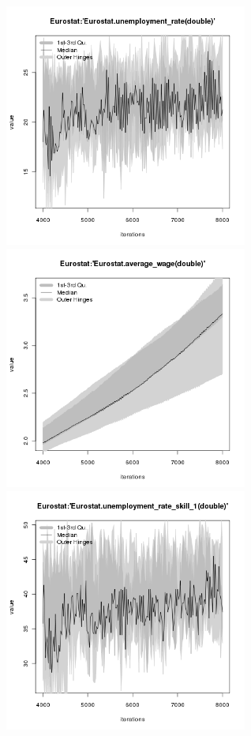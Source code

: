 \begin{figure}[H!]
\centering\leavevmode
\begin{minipage}{17cm}
\centering\leavevmode
\includegraphics[width=8cm]{./png/tax_0.08/Eurostat-unemployment_rate.png}
\includegraphics[width=8cm]{./png/tax_0.08/Eurostat-average_wage.png}\\
\includegraphics[width=8cm]{./png/tax_0.08/Eurostat-unemployment_rate_skill_1.png}

\end{minipage}
\end{figure}
